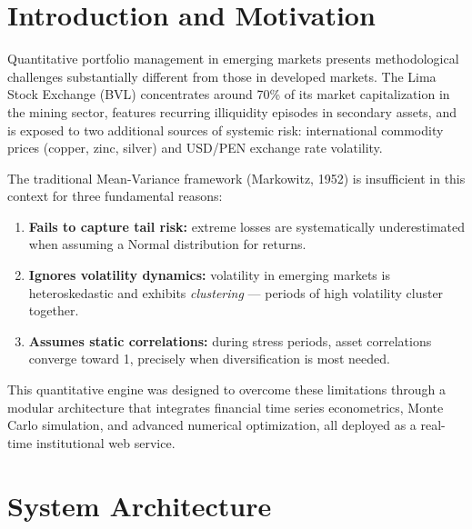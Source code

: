 \documentclass[11pt,a4paper]{article}
\begin{document}
\tableofcontents
\newpage

\section{Introduction and Motivation}

Quantitative portfolio management in emerging markets presents methodological challenges
substantially different from those in developed markets. The Lima Stock Exchange (BVL)
concentrates around 70\% of its market capitalization in the mining sector, features recurring
illiquidity episodes in secondary assets, and is exposed to two additional sources of
systemic risk: international commodity prices (copper, zinc, silver) and
USD/PEN exchange rate volatility.

The traditional Mean-Variance framework (Markowitz, 1952) is insufficient in this context
for three fundamental reasons:

\begin{enumerate}[leftmargin=*]
    \item \textbf{Fails to capture tail risk:} extreme losses are
    systematically underestimated when assuming a Normal distribution for returns.
    \item \textbf{Ignores volatility dynamics:} volatility in emerging markets is
    heteroskedastic and exhibits \textit{clustering} — periods of high volatility cluster together.
    \item \textbf{Assumes static correlations:} during stress periods, asset correlations
    converge toward 1, precisely when diversification is most needed.
\end{enumerate}

This quantitative engine was designed to overcome these limitations through a modular
architecture that integrates financial time series econometrics, Monte Carlo simulation, and
advanced numerical optimization, all deployed as a real-time institutional web service.

\section{System Architecture}
\end{document}
